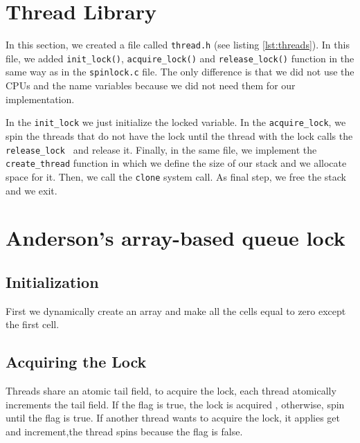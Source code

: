 \documentclass[10pt]{scrartcl}
\begin{document}
\section{Thread Library}\label{sec:threads}
In this section, we created a file called \texttt{thread.h} (see listing \ref{lst:threads}). In this file, we added \texttt{init\_lock()}, \texttt{acquire\_lock()} and \texttt{release\_lock()} function in the same way as in the \texttt{spinlock.c} file. The only difference is that we did not use the CPUs and the name variables because we did not need them for our implementation.

In the \texttt{init\_lock} we just initialize the locked variable. In the \texttt{acquire\_lock}, we spin the threads that do not have the lock until the thread with the lock calls the \texttt{release\_lock } and release it.
Finally, in the same file, we implement the \texttt{create\_thread} function in which we define the size of our stack and we allocate space for it. Then, we call the \texttt{clone} system call. As final step, we free the stack and we exit. 


\FloatBarrier

\section{Anderson's array-based queue lock}

\subsection{Initialization}
First we dynamically create an array and make all the cells equal to zero except the first cell.


\subsection{Acquiring the Lock}
Threads share an atomic tail field, to acquire the lock, each thread atomically increments the tail field.  If the flag is true, the lock is acquired , otherwise, spin until the flag is true. If another thread wants to acquire the lock, it applies get and increment,the thread spins because the flag is false.
\end{document}
